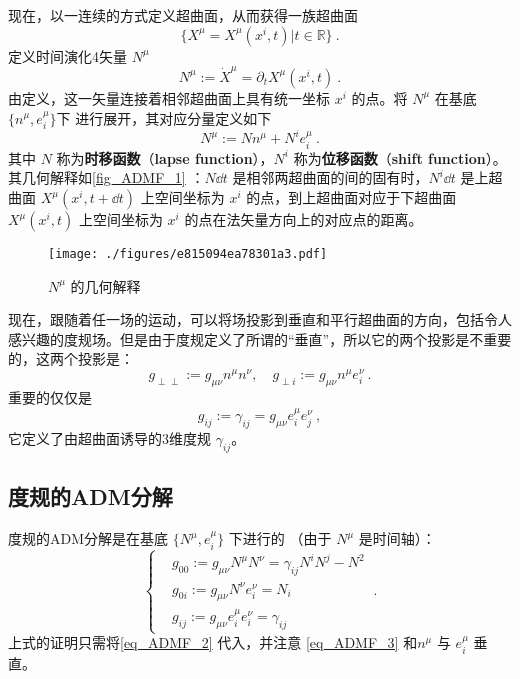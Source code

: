 现在，以一连续的方式定义超曲面，从而获得一族超曲面 
\begin{equation}
\{{X^\mu}= X^\mu(x^i,t)|t\in\mathbb R\}~.
\end{equation}
定义时间演化4矢量 $N^\mu$
\begin{equation}
N^\mu:=\dot{X}^\mu=\partial_t  X^\mu(x^i,t)~.
\end{equation}
由定义，这一矢量连接着相邻超曲面上具有统一坐标 $x^i$ 的点。将 $N^\mu$ 在基底 $\{n^\mu,e^\mu_i\}$下 进行展开，其对应分量定义如下
\begin{equation}\label{eq_ADMF_2}
N^\mu:=Nn^\mu+N^ie^\mu_i~.
\end{equation}
其中 $N$ 称为\textbf{时移函数}（\textbf{lapse function}），$N^i$ 称为\textbf{位移函数}（\textbf{shift function}）。其几何解释如\autoref{fig_ADMF_1} ：$N\dd t$ 是相邻两超曲面的间的固有时，$N^i\dd t$ 是上超曲面 $X^\mu(x^i,t+\dd t)$ 上空间坐标为 $x^i$ 的点，到上超曲面对应于下超曲面 $X^\mu(x^i,t)$ 上空间坐标为 $x^i$ 的点在法矢量方向上的对应点的距离。
\begin{figure}[ht]
\centering
\texttt{[image: ./figures/e815094ea78301a3.pdf]}
\caption{$N^\mu$ 的几何解释} \label{fig_ADMF_1}
\end{figure}

现在，跟随着任一场的运动，可以将场投影到垂直和平行超曲面的方向，包括令人感兴趣的度规场。但是由于度规定义了所谓的“垂直”，所以它的两个投影是不重要的，这两个投影是：
\begin{equation}
g_{\perp\perp}:=g_{\mu\nu}n^{\mu}n^{\nu},\quad g_{\perp i}:=g_{\mu\nu}n^{\mu}e^{\nu}_i~.
\end{equation}
重要的仅仅是
\begin{equation}\label{eq_ADMF_3}
g_{ij}:=\gamma_{ij}=g_{\mu\nu}e^{\mu}_ie^{\nu}_j~,
\end{equation}
它定义了由超曲面诱导的3维度规 $\gamma_{ij}$。
\subsection{度规的ADM分解}
度规的ADM分解是在基底 $\{N^{\mu},e^{\mu}_i\}$ 下进行的 （由于 $N^{\mu}$ 是时间轴）：
\begin{equation}
\left\{\begin{aligned}
&g_{00}:=g_{\mu\nu}N^{\mu}N^{\nu}=\gamma_{ij}N^iN^j-N^2\\
&g_{0i}:=g_{\mu\nu}N^{\nu}e^{\nu}_i=N_i\\
&g_{ij}:=g_{\mu\nu}e^{\mu}_ie^{\nu}_i=\gamma_{ij}
\end{aligned}\right.~.
\end{equation}
上式的证明只需将\autoref{eq_ADMF_2} 代入，并注意 \autoref{eq_ADMF_3} 和$n^\mu$ 与 $e^{\mu}_i$ 垂直。


